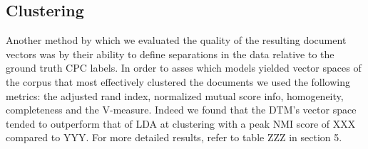 


\subsection{Clustering}
Another method by which we evaluated the quality of the resulting document vectors was by their ability to define separations in the data relative to the ground truth CPC labels. In order to asses which models yielded vector spaces of the corpus that most effectively clustered the documents we used the following metrics: the adjusted rand index, normalized mutual score info, homogeneity, completeness and the V-measure. Indeed we found that the DTM's vector space tended to outperform that of LDA at clustering with a peak NMI score of XXX compared to YYY. For more detailed results, refer to table ZZZ in section 5. 


 






